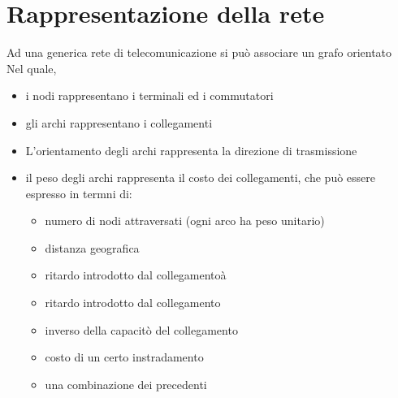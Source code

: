 \documentclass{report}
\begin{document}
        \section{Rappresentazione della rete}
            Ad una generica rete di telecomunicazione si può associare un grafo orientato
            \\
            Nel quale, 
            \begin{itemize}
                \item i nodi rappresentano i terminali ed i commutatori
                \item  gli archi rappresentano i collegamenti
                \item L'orientamento degli archi rappresenta la direzione di trasmissione
                \item il peso degli archi rappresenta il costo dei collegamenti, che può essere espresso in termni di:
                \begin{itemize}
                    \item numero di nodi attraversati (ogni arco ha peso unitario)
                    \item distanza geografica
                    \item ritardo introdotto dal collegamentoà
                    \item ritardo introdotto dal collegamento
                    \item inverso della capacitò del collegamento 
                    \item costo di un certo instradamento
                    \item una combinazione dei precedenti
                \end{itemize}
            \end{itemize} 
\end{document}
